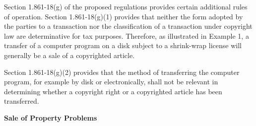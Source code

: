 \begin{select}
Section 1.861-18(g) of the proposed regulations provides certain additional rules of operation. Section 1.861-18(g)(1) provides that neither the form adopted by the parties to a transaction nor the classification of a transaction under copyright law are determinative for tax purposes. Therefore, as illustrated in Example 1, a transfer of a computer program on a disk subject to a shrink-wrap license will generally be a sale of a copyrighted article.

Section 1.861-18(g)(2) provides that the method of transferring the computer program, for example by disk or electronically, shall not be relevant in determining whether a copyright right or a copyrighted article has been transferred.
\end{select}

	\begin{center}
		\textbf{Sale of Property Problems}
	\end{center}
